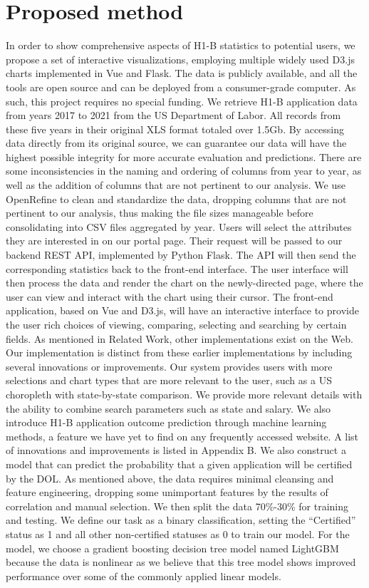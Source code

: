 \documentclass[sigconf]{acmart}
\begin{document}
\section{Proposed method}
In order to show comprehensive aspects of H1-B statistics to potential users, we propose a set of interactive visualizations, 
employing multiple widely used D3.js charts implemented in Vue and Flask.  The data is publicly available, and all the tools 
are open source and can be deployed from a consumer-grade computer. As such, this project requires no special funding.
We retrieve H1-B application data from years 2017 to 2021 from the US Department of Labor. All records from these five 
years in their original XLS format totaled over 1.5Gb. By accessing data directly from its original source, we can guarantee 
our data will have the highest possible integrity for more accurate evaluation and predictions. There are some inconsistencies 
in the naming and ordering of columns from year to year, as well as the addition of columns that are not pertinent to 
our analysis.  We use OpenRefine to clean and standardize the data, dropping columns that are not pertinent to our 
analysis, thus making the file sizes manageable before consolidating into CSV files aggregated by year. 
Users will select the attributes they are interested in on our portal page. Their request will be passed to our 
backend REST API, implemented by Python Flask. The API will then send the corresponding statistics back to the 
front-end interface. The user interface will then process the data and render the chart on the newly-directed page, 
where the user can view and interact with the chart using their cursor. The front-end application, based on Vue and D3.js, 
will have an interactive interface to provide the user rich choices of viewing, comparing, selecting and searching by certain fields. 
As mentioned in Related Work, other implementations exist on the Web. Our implementation is distinct from these earlier 
implementations by including several innovations or improvements. Our system provides users with more selections and 
chart types that are more relevant to the user, such as a US choropleth with state-by-state comparison. 
We provide more relevant details with the ability to combine search parameters such as state and salary. 
We also introduce H1-B application outcome prediction through machine learning methods, a feature we have yet to find on 
any frequently accessed website. A list of innovations and improvements is listed in Appendix B. We also construct 
a model that can predict the probability that a given application will be certified by the DOL. 
As mentioned above, the data requires minimal cleansing and feature engineering, dropping some unimportant features 
by the results of correlation and manual selection. We then split the data 70\%-30\% for training and testing. 
We define our task as a binary classification, setting the “Certified” status as 1 and all other non-certified statuses 
as 0 to train our model. For the model, we choose a gradient boosting decision tree model named LightGBM because the data 
is nonlinear as we believe that this tree model shows improved performance over some of the commonly applied linear models. 
\end{document}
